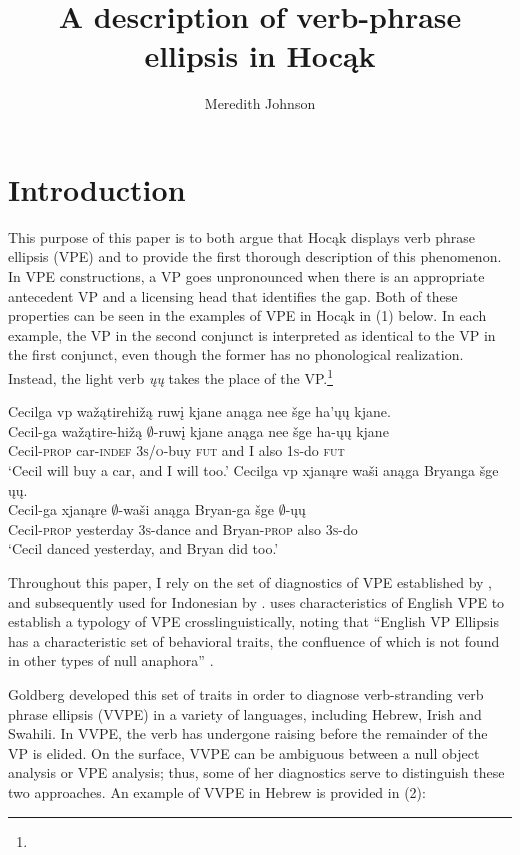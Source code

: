 \documentclass[output=paper]{LSP/langsci}
\author{Meredith Johnson}
\title{A description of verb-phrase ellipsis in Hocąk}
\begin{document}
\section{Introduction}

This purpose of this paper is to both argue that Hocąk displays verb phrase ellipsis (VPE) and to provide the first thorough description of this phenomenon. In VPE constructions, a VP goes unpronounced when there is an appropriate antecedent VP and a licensing head that identifies the gap. Both of these properties can be seen in the examples of VPE in Hocąk in (1) below. In each example, the VP in the second conjunct is interpreted as identical to the VP in the first conjunct, even though the former has no phonological realization. Instead, the light verb \emph{ųų} takes the place of the VP.\footnote{}


\ea
\ea
\glll Cecilga {\ob}{vp} wažątirehižą ruwį{\cb} kjane anąga nee šge {\ob}ha'ųų{\cb} kjane.\\
Cecil-ga {} wažątire-hižą {$\emptyset$}-ruwį kjane anąga nee šge ha-ųų kjane\\
Cecil-\textsc{prop} {} car-\textsc{indef} \textsc{3s/o}-buy \textsc{fut} and I also \textsc{1s}-do \textsc{fut}\\
\trans `Cecil will buy a car, and I will too.' 
\ex
\glll Cecilga {\ob}{vp} xjanąre waši{\cb} anąga Bryanga šge {\ob}ųų{\cb}.\\
Cecil-ga {} xjanąre {$\emptyset$}-waši anąga Bryan-ga šge {$\emptyset$}-ųų\\
Cecil-\textsc{prop} {} yesterday \textsc{3s}-dance and Bryan-\textsc{prop} also \textsc{3s}-do\\
\trans `Cecil danced yesterday, and Bryan did too.'
\z
\z

Throughout this paper, I rely on the set of diagnostics of VPE established by \citet{Goldberg2005}, and subsequently used for Indonesian by \citet{Fortin2007}. \citet{Goldberg2005} uses characteristics of English VPE to establish a typology of VPE crosslinguistically, noting that ``English VP Ellipsis has a characteristic set of behavioral traits, the confluence of which is not found in other types of null anaphora'' \citep[27]{Goldberg2005}. 

Goldberg developed this set of traits in order to diagnose verb-stranding verb phrase ellipsis (VVPE) in a variety of languages, including Hebrew, Irish and Swahili. In VVPE, the verb has undergone raising before the remainder of the VP is elided. On the surface, VVPE can be ambiguous between a null object analysis or VPE analysis; thus, some of her diagnostics serve to distinguish these two approaches. An example of VVPE in Hebrew is provided in (2):
\end{document}

